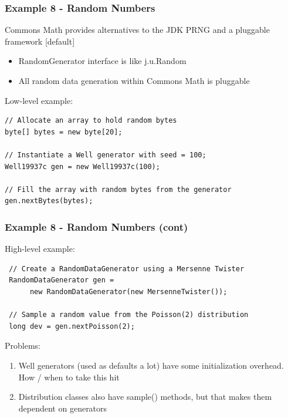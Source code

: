 \documentclass[14pt,mathserif]{beamer}
\begin{document}
\begin{frame}[fragile]
  \frametitle{Example 8 - Random Numbers}
  
\begin{small} 
Commons Math provides alternatives to the JDK PRNG and a pluggable framework
[default]
\begin{itemize}
\item RandomGenerator interface is like j.u.Random
\item All random data generation within Commons Math is pluggable
\end {itemize}
Low-level example:
\begin{verbatim}
// Allocate an array to hold random bytes
byte[] bytes = new byte[20];

// Instantiate a Well generator with seed = 100;
Well19937c gen = new Well19937c(100);

// Fill the array with random bytes from the generator
gen.nextBytes(bytes);
\end{verbatim}
\end{small}
\end{frame}

\begin{frame}[fragile]
  \frametitle{Example 8 - Random Numbers (cont)}  
  
High-level example:

\begin{verbatim}
 // Create a RandomDataGenerator using a Mersenne Twister 
 RandomDataGenerator gen = 
      new RandomDataGenerator(new MersenneTwister());
      
 // Sample a random value from the Poisson(2) distribution
 long dev = gen.nextPoisson(2);
 \end{verbatim}

Problems:
\begin{small}
\begin{enumerate}
\item Well generators (used as defaults a lot) have some initialization overhead.
How / when to take this hit
\item Distribution classes also have sample() methods, but that makes them dependent on
generators
\end{enumerate}
\end{small}
\end{frame}
\end{document}
